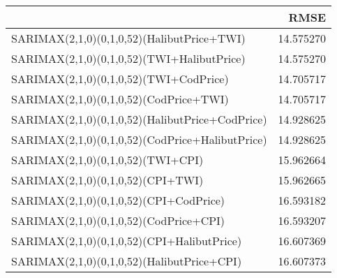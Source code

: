 \begin{tabular}{lr}
\toprule
 & RMSE \\
\midrule
SARIMAX(2,1,0)(0,1,0,52)(HalibutPrice+TWI) & 14.575270 \\
SARIMAX(2,1,0)(0,1,0,52)(TWI+HalibutPrice) & 14.575270 \\
SARIMAX(2,1,0)(0,1,0,52)(TWI+CodPrice) & 14.705717 \\
SARIMAX(2,1,0)(0,1,0,52)(CodPrice+TWI) & 14.705717 \\
SARIMAX(2,1,0)(0,1,0,52)(HalibutPrice+CodPrice) & 14.928625 \\
SARIMAX(2,1,0)(0,1,0,52)(CodPrice+HalibutPrice) & 14.928625 \\
SARIMAX(2,1,0)(0,1,0,52)(TWI+CPI) & 15.962664 \\
SARIMAX(2,1,0)(0,1,0,52)(CPI+TWI) & 15.962665 \\
SARIMAX(2,1,0)(0,1,0,52)(CPI+CodPrice) & 16.593182 \\
SARIMAX(2,1,0)(0,1,0,52)(CodPrice+CPI) & 16.593207 \\
SARIMAX(2,1,0)(0,1,0,52)(CPI+HalibutPrice) & 16.607369 \\
SARIMAX(2,1,0)(0,1,0,52)(HalibutPrice+CPI) & 16.607373 \\
\bottomrule
\end{tabular}
